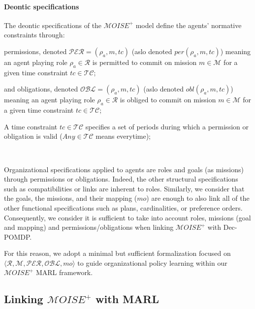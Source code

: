 \documentclass[pdflatex,sn-mathphys-num]{sn-jnl}%
\theoremstyle{thmstyleone}%
\theoremstyle{thmstyletwo}%
\theoremstyle{thmstylethree}%
\begin{document}
\paragraph{\textbf{Deontic specifications}}

The deontic specifications of the $\mathcal{M}OISE^+$ model define the agents' normative constraints through:
%
\begin{enumerate*}[label={\roman*)}, itemjoin={; \quad}]
    \item permissions, denoted $\mathcal{PER} = (\rho_a,m,tc)$ (aslo denoted $per(\rho_a,m,tc)$) meaning an agent playing role $\rho_a \in \mathcal{R}$ is permitted to commit on mission $m \in \mathcal{M}$ for a given time constraint $tc \in \mathcal{TC}$;
    \item and obligations, denoted $\mathcal{OBL} = (\rho_a,m,tc)$ (aslo denoted $obl(\rho_a,m,tc)$) meaning an agent playing role $\rho_a \in \mathcal{R}$ is obliged to commit on mission $m \in \mathcal{M}$ for a given time constraint $tc \in \mathcal{TC}$;
\end{enumerate*}
%
A time constraint $tc \in \mathcal{TC}$ specifies a set of periods during which a permission or obligation is valid ($Any \in \mathcal{TC}$ means everytime);

\

\noindent Organizational specifications applied to agents are roles and goals (as missions) through permissions or obligations. Indeed, the other structural specifications such as compatibilities or links are inherent to roles. Similarly, we consider that the goals, the missions, and their mapping ($mo$) are enough to also link all of the other functional specifications such as plans, cardinalities, or preference orders.
Consequently, we consider it is sufficient to take into account roles, missions (goal and mapping) and permissions/obligations when linking $\mathcal{M}OISE^+$ with Dec-POMDP. 

For this reason, we adopt a minimal but sufficient formalization focused on $\langle \mathcal{R}, \mathcal{M}, \mathcal{PER}, \mathcal{OBL}, mo \rangle$ to guide organizational policy learning within our $\mathcal{M}OISE^+$ MARL framework.


\subsection{Linking $\mathcal{M}OISE^+$ with MARL}
\end{document}
